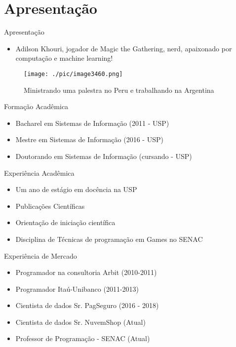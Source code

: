 \section{Apresentação}

\begin{frame}	
	\begin{block}{Apresentação}	
		\begin{itemize}
			\item Adilson Khouri,  jogador de Magic the Gathering, nerd, apaixonado por computação e machine learning!
		\end{itemize}
		 \begin{figure}[!htb]
			\centering	  				
			\texttt{[image: ./pic/image3460.png]}
			\caption{Ministrando uma palestra no Peru e trabalhando na Argentina}
			\label{fig_adilson_argentina}
		\end{figure}
	\end{block}
\end{frame}
			
\begin{frame}	
	\begin{block}{Formação Acadêmica}
		 \begin{itemize}
			  \item Bacharel em Sistemas de Informação (2011 - USP)
			  \item Mestre em Sistemas de Informação (2016 - USP)
			  \item Doutorando em Sistemas de Informação (cursando - USP)
		  \end{itemize}
	\end{block}
\end{frame}

\begin{frame}	
	\begin{block}{Experiência Acadêmica}
		 \begin{itemize}
			  \item Um ano de estágio em docência na USP
			  \item Publicações Científicas
			  \item Orientação de iniciação científica
			  \item Disciplina de Técnicas de programação em Games no SENAC
		  \end{itemize}
	\end{block}
\end{frame}

\begin{frame}	
	\begin{block}{Experiência de Mercado}
		\begin{itemize}
			\item Programador na consultoria Arbit (2010-2011)
			\item Programador Itaú-Unibanco (2011-2013)
			\item Cientista de dados Sr. PagSeguro (2016 - 2018)
			\item Cientista de dados Sr. NuvemShop (Atual)
			\item Professor de Programação - SENAC (Atual)
		\end{itemize}
	\end{block}
\end{frame}

